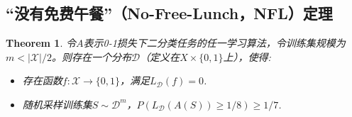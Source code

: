 \documentclass{article}
\newtheorem{theorem}{Theorem}
\begin{document}
\subsection{“没有免费午餐”（No-Free-Lunch，NFL）定理}

	\begin{theorem}
	令$A$表示0-1损失下二分类任务的任一学习算法，令训练集规模为$m<|\mathcal{X}|/2$。则存在一个分布$\mathcal{D}$（定义在${X}\times\{0,1\}$上），使得:
	
	\begin{itemize}
	\item 存在函数$f:\mathcal{X}\rightarrow\{0,1\}$，满足$L_\mathcal{D}(f)=0$.
	\item 随机采样训练集$S\sim\mathcal{D}^m$，$P(L_\mathcal{D}(A(S))\geq 1/8)\geq 1/7$.
	\end{itemize} 
	\end{theorem}
	
\end{document}
